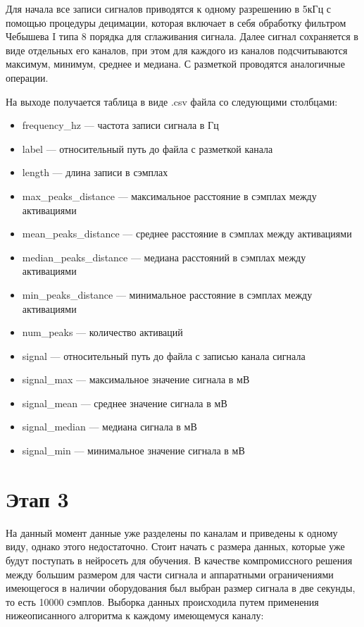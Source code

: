 Для начала все записи сигналов приводятся к одному разрешению в 5кГц с помощью
процедуры децимации, которая включает в себя обработку фильтром Чебышева I типа
8 порядка для сглаживания сигнала. Далее сигнал сохраняется в виде отдельных
его каналов, при этом для каждого из каналов подсчитываются максимум, минимум,
среднее и медиана. С разметкой проводятся аналогичные операции.

На выходе получается таблица в виде .csv файла со следующими столбцами:

\begin{itemize}
	\item frequency\_hz --- частота записи сигнала в Гц
	\item label --- относительный путь до файла с разметкой канала
	\item length --- длина записи в сэмплах
	\item max\_peaks\_distance --- максимальное расстояние в сэмплах между активациями
	\item mean\_peaks\_distance --- среднее расстояние в сэмплах между активациями
	\item median\_peaks\_distance --- медиана расстояний в сэмплах между активациями
	\item min\_peaks\_distance --- минимальное расстояние в сэмплах между активациями
	\item num\_peaks --- количество активаций
	\item signal --- относительный путь до файла с записью канала сигнала
	\item signal\_max --- максимальное значение сигнала в мВ
	\item signal\_mean --- среднее значение сигнала в мВ
	\item signal\_median --- медиана сигнала	в мВ
	\item signal\_min --- минимальное значение сигнала в мВ
\end{itemize}

\section{Этап 3} На данный момент данные уже разделены по каналам и приведены к
одному виду, однако этого недостаточно. Стоит начать с размера данных, которые
уже будут поступать в нейросеть для обучения. В качестве компромиссного решения
между большим размером для части сигнала и аппаратными ограничениями имеющегося
в наличии оборудования был выбран размер сигнала в две секунды, то есть 10000
сэмплов. Выборка данных происходила путем применения нижеописанного алгоритма к
каждому имеющемуся каналу:

